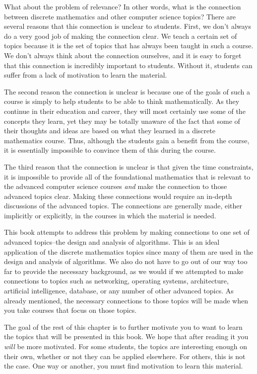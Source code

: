 What about the problem of relevance?  In other words, what is the connection
between discrete mathematics and other computer science topics?
There are several reasons that this connection is unclear to students.  
First, we don't always do a very good job of making the connection clear.  
We teach a certain set of topics because it is the
set of topics that has always been taught in such a course.   
We don't always think about the connection ourselves, 
and it is easy to forget that this connection is incredibly important to students.  
Without it, students can suffer from a lack of motivation to learn the material.

The second reason the connection is unclear is because one of the goals of such a course 
is simply to help students to be able to think mathematically.  As they continue in their
education and career, they will most certainly use some of the concepts they learn, yet they
may be totally unaware of the fact that some of their thoughts and ideas are based on 
what they learned in a discrete mathematics course.  Thus, although the students gain a 
benefit from the course, it is essentially impossible to convince them of this during
the course.

The third reason that the connection is unclear is that given the time constraints, 
it is impossible to provide all of the foundational mathematics that is relevant
to the advanced computer science courses {\em and} make the connection to those advanced topics
clear.  Making these connections would require an in-depth discussions of the advanced 
topics.  
The connections are generally made, either implicitly or
explicitly, in the courses in which the material is needed.

This book attempts to address this problem by making connections to one set 
of advanced topics--the design and analysis of algorithms.  This is
an ideal application of the discrete mathematics topics since many of them 
are used in the design and analysis of algorithms.  We also do not have to go out of our
way too far to provide the necessary background, as we would if we attempted to make connections
to topics such as networking, operating systems, architecture, artificial intelligence, database,
or any number of other advanced topics.  As already mentioned, 
the necessary connections to those topics will be made
when you take courses that focus on those topics.

The goal of the rest of this chapter is to further motivate you to want to learn the topics
that will be presented in this book.  We hope that after reading it you {\em will} be more
motivated.  For some students, the topics are interesting enough on their own, whether or not they
can be applied elsewhere.  For others, this is not the case.  
One way or another, you must find motivation to learn this material.


